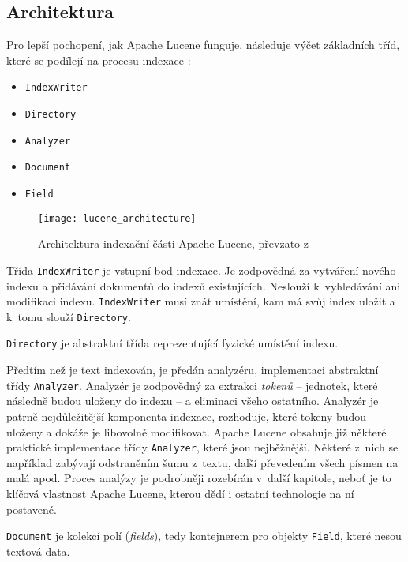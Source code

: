 \documentclass[11pt,oneside]{fithesis2}
\begin{document}
\subsection{Architektura}
Pro lepší pochopení, jak Apache Lucene funguje, následuje výčet základních tříd, které se podílejí na procesu indexace \cite[s.~26]{LuceneAction}:
\begin{itemize}
	\item \texttt{IndexWriter}
	\item \texttt{Directory}
	\item \texttt{Analyzer}
	\item \texttt{Document}
	\item \texttt{Field}
\end{itemize}

\begin{figure}[htp]
	\begin{center}
		\texttt{[image: lucene\_architecture]}
	\end{center}
	\caption{Architektura indexační části Apache Lucene, převzato z~\cite[s.~26]{LuceneAction}}	
\end{figure}

Třída \texttt{IndexWriter} je vstupní bod indexace. Je zodpovědná za vytváření nového indexu a přidávání dokumentů do indexů existujících. Neslouží k~vyhledávání ani modifikaci indexu. \texttt{IndexWriter} musí znát umístění, kam má svůj index uložit a k~tomu slouží \texttt{Directory}. 

\texttt{Directory} je abstraktní třída reprezentující fyzické umístění indexu.  

Předtím než je text indexován, je předán analyzéru, implementaci abstraktní třídy \texttt{Analyzer}. Analyzér je zodpovědný za extrakci \emph{tokenů} -- jednotek, které následně budou uloženy do indexu \cite[s.~116]{LuceneAction} -- a eliminaci všeho ostatního. Analyzér je patrně nejdůležitější komponenta indexace, rozhoduje, které tokeny budou uloženy a dokáže je libovolně modifikovat. Apache Lucene obsahuje již některé praktické implementace třídy \texttt{Analyzer}, které jsou nejběžnější. Některé z~nich  se například zabývají odstraněním šumu z~textu, další převedením všech písmen na malá apod. Proces analýzy je podrobněji rozebírán v~další kapitole, neboť je to klíčová vlastnost Apache Lucene, kterou dědí i ostatní technologie na ní postavené.

\texttt{Document} je kolekcí polí (\emph{fields}), tedy kontejnerem pro objekty \texttt{Field}, které nesou textová data. 
\end{document}
